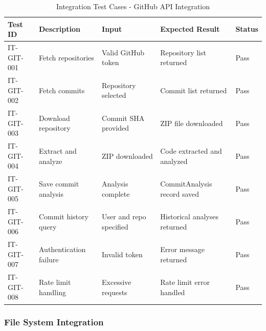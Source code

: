 \documentclass[12pt,a4paper]{article}
\begin{document}
    \begin{table}[H]
        \caption{Integration Test Cases - GitHub API Integration}
        \begin{tabular}{|p{2cm}|p{4cm}|p{3cm}|p{3cm}|p{1.5cm}|}
            \hline
            \textbf{Test ID} & \textbf{Description} & \textbf{Input} & \textbf{Expected Result} & \textbf{Status} \\
            \hline
            IT-GIT-001 & Fetch repositories & Valid GitHub token & Repository list returned & Pass \\
            \hline
            IT-GIT-002 & Fetch commits & Repository selected & Commit list returned & Pass \\
            \hline
            IT-GIT-003 & Download repository & Commit SHA provided & ZIP file downloaded & Pass \\
            \hline
            IT-GIT-004 & Extract and analyze & ZIP downloaded & Code extracted and analyzed & Pass \\
            \hline
            IT-GIT-005 & Save commit analysis & Analysis complete & CommitAnalysis record saved & Pass \\
            \hline
            IT-GIT-006 & Commit history query & User and repo specified & Historical analyses returned & Pass \\
            \hline
            IT-GIT-007 & Authentication failure & Invalid token & Error message returned & Pass \\
            \hline
            IT-GIT-008 & Rate limit handling & Excessive requests & Rate limit error handled & Pass \\
            \hline
        \end{tabular}
    \end{table}

    \subsubsection{File System Integration}
\end{document}
